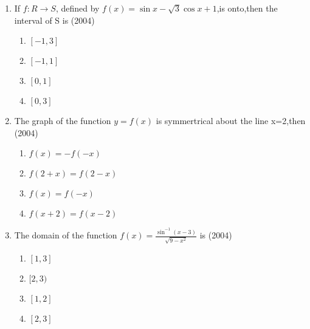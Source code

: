 \documentclass[journal,12pt,twocolumn]{IEEEtran}
\theoremstyle{remark}
\begin{document}
\begin{enumerate}[start=4]
       \item If $f:R\to S$, defined by $f(x)=\sin{x}-\sqrt{3}\cos{x}+1$,is onto,then the interval of S is \hfill(2004)

	       \begin{enumerate}
		       \item $[-1,3]$
		       \item $[-1,1]$
		       \item $[0,1]$
		       \item $[0,3]$
	       \end{enumerate}

       \item The graph of the function $y=f(x)$ is symmertrical about the line x=2,then \hfill(2004)
	       \begin{enumerate}
		       \item $f(x)=-f(-x)$
		       \item $f(2+x)=f(2-x)$
		       \item $f(x)=f(-x)$
		       \item $f(x+2)=f(x-2)$
	       \end{enumerate}

       \item The domain of the function $f(x)=\frac{\sin^{-1}(x-3)}{\sqrt{9-x^{2}}}$ is \hfill(2004)
              \begin{enumerate}
		      \item $[1,3]$
		      \item $[2,3)$
		      \item $[1,2]$
		      \item $[2,3]$
	      \end{enumerate}


\end{enumerate}
\end{document}
